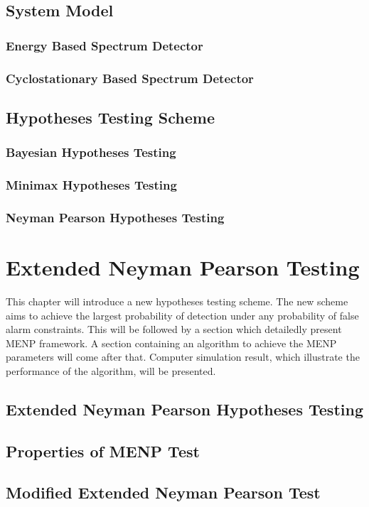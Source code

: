 \documentclass{article}
\begin{document}
\begin{spacing}{2.0}
\subsection{System Model}
\subsubsection{Energy Based Spectrum Detector}
\subsubsection{Cyclostationary Based Spectrum Detector}
\subsection{Hypotheses Testing Scheme}
\subsubsection{Bayesian Hypotheses Testing}
\subsubsection{Minimax Hypotheses Testing}
\subsubsection{Neyman Pearson Hypotheses Testing}
\newpage
\section{Extended Neyman Pearson Testing }
This chapter will introduce a new hypotheses testing scheme. The new scheme aims to achieve the largest probability of detection under any probability of false alarm constraints. This will be followed by a section which detailedly present MENP framework. A section containing an algorithm to achieve the MENP parameters will come after that. Computer simulation result, which illustrate the performance of the algorithm, will be presented.  
\subsection{Extended Neyman Pearson Hypotheses Testing}
\subsection{Properties of MENP Test}
\subsection{Modified Extended Neyman Pearson Test}

\end{spacing}
\end{document}
